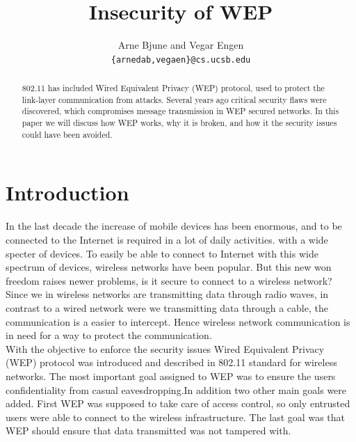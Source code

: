 \documentclass[twocolumn,11pt]{IEEEtran}
\begin{document}
\title{Insecurity of WEP}


\author{Arne Bjune and Vegar Engen \\ \texttt{\{arnedab,vegaen\}@cs.ucsb.edu}}


\maketitle

\begin{abstract}
802.11 has included Wired Equivalent Privacy (WEP) protocol, used to protect the link-layer communication from attacks. Several years ago critical security flaws were discovered, which compromises message transmission in WEP secured networks. In this paper we will discuss how WEP works, why it is broken, and how it the security issues could have been avoided.
\end{abstract}

\section {Introduction}
\label{sec:introduction}


In the last decade the increase of mobile devices has been enormous, and to be connected to the Internet is required in a lot of daily activities.  with a wide specter of devices. To easily be able to connect to Internet with this wide spectrum of devices, wireless networks have been popular. But this new won freedom raises newer problems, is it secure to connect to a wireless network? Since we in wireless networks are transmitting data through radio waves, in contrast to a wired network were we transmitting data through a cable, the communication is a easier to intercept. Hence wireless network communication is in need for a way to protect the communication. \\


With the objective to enforce the security issues Wired Equivalent Privacy (WEP) protocol was introduced and described in 802.11 standard\cite{IEEE:Fast} for wireless networks. The most important goal assigned to WEP was to ensure the users confidentiality from casual eavesdropping.In addition two other main goals were added. First WEP was supposed to take care of access control, so only entrusted users were able to connect to the wireless infrastructure. The last goal was that WEP should ensure that data transmitted was not tampered with.   \\
\end{document}
